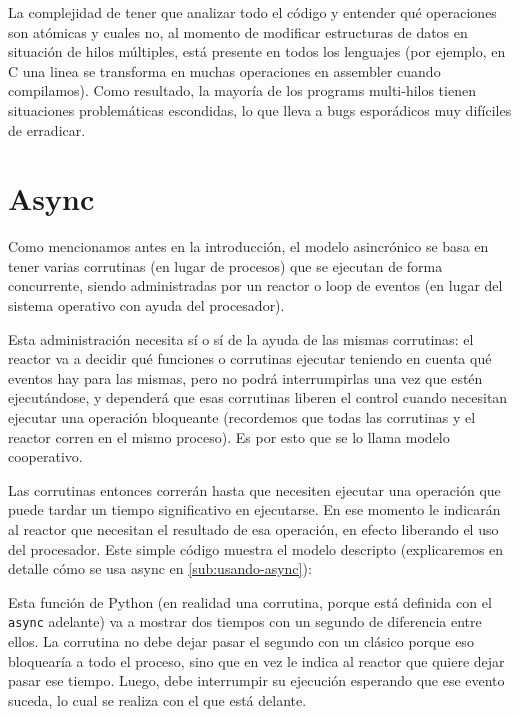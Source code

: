 La complejidad de tener que analizar todo el código y entender qué operaciones son atómicas y cuales no, al momento de modificar estructuras de datos en situación de hilos múltiples, está presente en todos los lenguajes (por ejemplo, en C una linea se transforma en muchas operaciones en assembler cuando compilamos). Como resultado, la mayoría de los programs multi-hilos tienen situaciones problemáticas escondidas, lo que lleva a bugs esporádicos muy difíciles de erradicar.


\section{Async}

Como mencionamos antes en la introducción, el modelo asincrónico se basa en tener varias corrutinas (en lugar de procesos) que se ejecutan de forma concurrente, siendo administradas por un reactor o loop de eventos (en lugar del sistema operativo con ayuda del procesador).

Esta administración necesita sí o sí de la ayuda de las mismas corrutinas: el reactor va a decidir qué funciones o corrutinas ejecutar teniendo en cuenta qué eventos hay para las mismas, pero no podrá interrumpirlas una vez que estén ejecutándose, y dependerá que esas corrutinas liberen el control cuando necesitan ejecutar una operación bloqueante (recordemos que todas las corrutinas y el reactor corren en el mismo proceso). Es por esto que se lo llama modelo cooperativo.

Las corrutinas entonces correrán hasta que necesiten ejecutar una operación que puede tardar un tiempo significativo en ejecutarse. En ese momento le indicarán al reactor que necesitan el resultado de esa operación, en efecto liberando el uso del procesador. Este simple código muestra el modelo descripto (explicaremos en detalle cómo se usa async en \ref{sub:usando-async}):


Esta función de Python (en realidad una corrutina, porque está definida con el \texttt{async} adelante) va a mostrar dos tiempos con un segundo de diferencia entre ellos. La corrutina no debe dejar pasar el segundo con un  clásico porque eso bloquearía a todo el proceso, sino que en vez le indica al reactor que quiere dejar pasar ese tiempo. Luego, debe interrumpir su ejecución esperando que ese evento suceda, lo cual se realiza con el  que está delante. 

